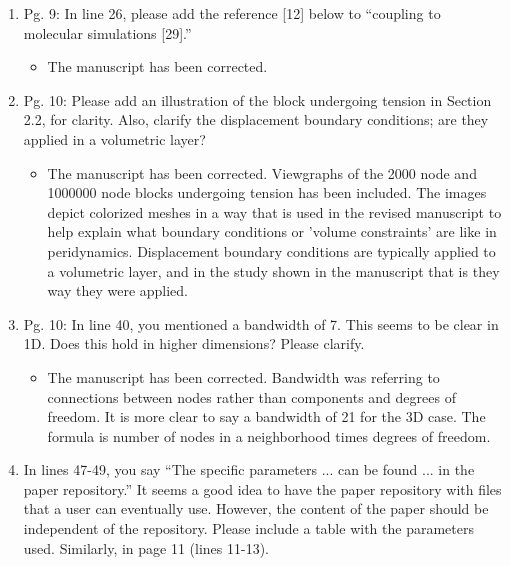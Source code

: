 \documentclass{article}
\begin{document}
\begin{enumerate}
\item
Pg. 9: In line 26, please add the reference [12] below to “coupling to molecular
simulations [29].”

{\color{red}  
\begin{itemize}
    \item
        The manuscript has been corrected.
  \end{itemize}}

\item
Pg. 10: Please add an illustration of the block undergoing tension in Section 2.2,
for clarity. Also, clarify the displacement boundary conditions; are they applied in a
volumetric layer?

{\color{red}  
\begin{itemize}
    \item
        The manuscript has been corrected. Viewgraphs of the 2000 node and 1000000 node blocks undergoing tension has been included. The images depict colorized meshes in a way that is used in the revised manuscript to help explain what boundary conditions or 'volume constraints' are like in peridynamics. Displacement boundary conditions are typically applied to a volumetric layer, and in the study shown in the manuscript that is they way they were applied.
  \end{itemize}}

\item
Pg. 10: In line 40, you mentioned a bandwidth of 7. This seems to be clear in 1D.
Does this hold in higher dimensions? Please clarify.

{\color{red}  
\begin{itemize}
    \item
        The manuscript has been corrected. Bandwidth was referring to connections between nodes rather than components and degrees of freedom. It is more clear to say a bandwidth of 21 for the 3D case. The formula is number of nodes in a neighborhood times degrees of freedom.
  \end{itemize}}

    \item
        In lines 47-49, you say “The speciﬁc parameters ... can be found ... in the
        paper repository.” It seems a good idea to have the paper repository with ﬁles that a
        user can eventually use. However, the content of the paper should be independent
        of the repository. Please include a table with the parameters used. Similarly, in
        page 11 (lines 11-13).


\end{enumerate}
\end{document}
